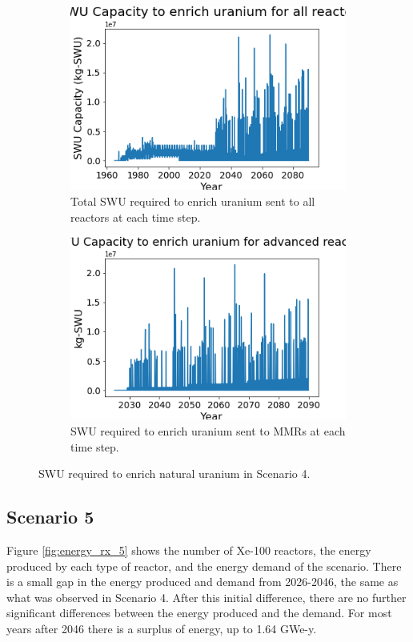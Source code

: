 \begin{figure}
    \centering
    \begin{subfigure}{0.4\textwidth}
        \centering
        \includegraphics[scale=0.3]{figures/totalswu_scenarios_4.png}
        \caption{Total \gls{SWU} required to enrich uranium sent to all reactors at each time step.}
        \label{fig:totalswu_4}
    \end{subfigure}
    \begin{subfigure}{0.4\textwidth}
        \centering
        \includegraphics[scale=0.3]{figures/haleuSWU_scenarios_4.png}
        \caption{\gls{SWU} required to enrich uranium sent to \glspl{MMR} at each time step.}
        \label{fig:haleuswu_4}
    \end{subfigure}
    \caption{\gls{SWU} required to enrich natural uranium in Scenario 4.}
    \label{fig:swu_4}
\end{figure}


\subsection{Scenario 5}
Figure \ref{fig:energy_rx_5} shows the number of Xe-100 reactors, the 
energy produced by each type of reactor, and the energy demand of the 
scenario. There is a small gap in the energy produced and demand from 
2026-2046, the same as what was observed in Scenario 4. After this 
initial difference, there are no further significant differences between 
the energy produced and the demand. For most years after 2046 there 
is a surplus of energy, up to 1.64 GWe-y. 

